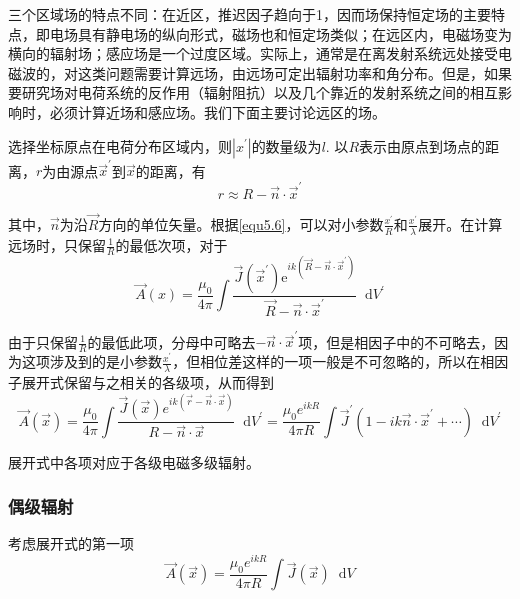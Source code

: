 \documentclass[UTF8]{ctexart}
\newcommand*{\dif}{\mathop{}\!\mathrm{d}}
\begin{document}
    三个区域场的特点不同：在近区，推迟因子趋向于1，因而场保持恒定场的主要特点，即电场具有静电场的纵向形式，磁场也和恒定场类似；在远区内，电磁场变为横向的辐射场；感应场是一个过度区域。实际上，通常是在离发射系统远处接受电磁波的，对这类问题需要计算远场，由远场可定出辐射功率和角分布。但是，如果要研究场对电荷系统的反作用（辐射阻抗）以及几个靠近的发射系统之间的相互影响时，必须计算近场和感应场。我们下面主要讨论远区的场。

    选择坐标原点在电荷分布区域内，则$|x^{\prime}|$的数量级为$l$. 以$R$表示由原点到场点的距离，$r$为由源点$\vec{x}^{\prime}$到$\vec{x}$的距离，有
    \begin{equation}
        r \approx R - \vec{n} \cdot \vec{x}^{\prime}
    \end{equation}

\noindent 其中，$\vec{n}$为沿$\vec{R}$方向的单位矢量。根据\autoref{equ5.6}，可以对小参数$\frac{x^{\prime}}{R}$和$\frac{x^{\prime}}{\lambda}$展开。在计算远场时，只保留$\frac{1}{R}$的最低次项，对于
\begin{equation}
    \vec{A}(x)=\frac{\mu_{0}}{4 \pi} \int \frac{\vec{J}\left(\vec{x}^{\prime}\right) \mathrm{e}^{i k\left(\vec{R}-\vec{n} \cdot \vec{x}^{\prime}\right)}}{\vec{R}-\vec{n} \cdot \vec{x}^{\prime}} \mathop{}\!\mathrm{d}  V^{\prime}
\end{equation}

\noindent 由于只保留$\frac{1}{R}$的最低此项，分母中可略去$- \vec{n} \cdot \vec{x}^{\prime}$项，但是相因子中的不可略去，因为这项涉及到的是小参数$\frac{x^{\prime}}{\lambda}$，但相位差这样的一项一般是不可忽略的，所以在相因子展开式保留与之相关的各级项，从而得到
\begin{equation}
    \vec{A}(\vec{x})=\frac{\mu_{0}}{4 \pi} \int \frac{\vec{J}(\vec{x}) e^{i k(\vec{r}-\vec{n} \cdot \vec{x})}}{R-\vec{n} \cdot \vec{x}} \mathop{}\!\mathrm{d} V^{\prime} = \frac{\mu_0 e^{ikR}}{4 \pi R} \int \vec{J}^{\prime} (1-ik\vec{n} \cdot \vec{x}^{\prime} + \cdots) \dif V^{\prime} \label{equ5.9}
\end{equation}

\noindent 展开式中各项对应于各级电磁多级辐射。

    \subsubsection{偶级辐射}
    考虑展开式的第一项
    \begin{equation}
        \vec{A}(\vec{x})=\frac{\mu_{0} e^{i k R}}{4 \pi R} \int \vec{J}(\vec{x}) \mathop{}\!\mathrm{d} V
    \end{equation}
\end{document}
